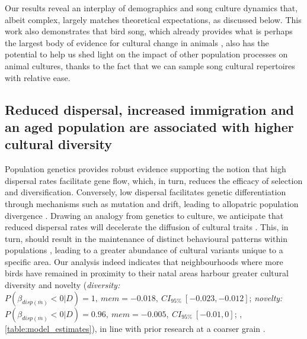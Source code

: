 \documentclass[9pt, twocolumn, twoside]{gsajnl}
\begin{document}
Our results reveal an interplay of demographics and song culture dynamics that, albeit complex, largely matches theoretical expectations, as discussed below. This work also demonstrates that bird song, which already provides what is perhaps the largest body of evidence for cultural change in animals \parencite{laland2006}, also has the potential to help us shed light on the impact of other population processes on animal cultures, thanks to the fact that we can sample song cultural repertoires with relative ease.


\subsection{Reduced dispersal, increased immigration and an aged population are associated with higher cultural diversity}

Population genetics provides robust evidence supporting the notion that high dispersal rates facilitate gene flow, which, in turn, reduces the efficacy of selection and diversification. Conversely, low dispersal facilitates genetic differentiation through mechanisms such as mutation and drift, leading to allopatric population divergence \parencite{suarez2022, claramunt2011, papadopoulou2009}. Drawing an analogy from genetics to culture, we anticipate that reduced dispersal rates will decelerate the diffusion of cultural traits \parencite{nunn2009}. This, in turn, should result in the maintenance of distinct behavioural patterns within populations \parencite{whitehead2012, planque2014}, leading to a greater abundance of cultural variants unique to a specific area. Our analysis indeed indicates that neighbourhoods where more birds have remained in proximity to their natal areas harbour greater cultural diversity and novelty (\textit{diversity:} $P(\beta_{disp (\overline{m})} < 0 | D) = 1,~ mem = -0.018,~CI_{95\%}~[-0.023, -0.012]$; \textit{novelty:} $P(\beta_{disp (\overline{m})} < 0 | D) = 0.96,~ mem = -0.005,~CI_{95\%}~[-0.01, 0]$; , \autoref{table:model_estimates}), in line with prior research at a coarser grain \parencite{fayet2014}. 
\end{document}
